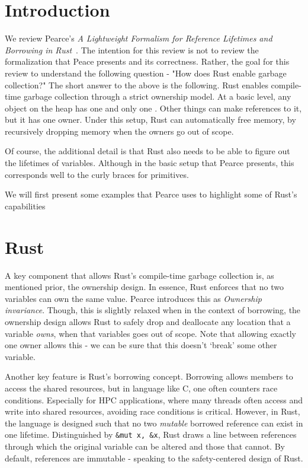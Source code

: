 \section{Introduction}
We review Pearce's \textit{A Lightweight Formalism for Reference Lifetimes and Borrowing in Rust}~\cite{paper}. 
%
The intention for this review is not to review the formalization that Peace presents and its correctness.
%
Rather, the goal for this review to understand the following question - "How does Rust enable  garbage collection?"
%
The short answer to the above is the following.
%
Rust enables compile-time garbage collection through a strict ownership model.
%
At a basic level, any object on the heap has one and only one . 
%
Other things can make references to it, but it has one owner.
%
Under this setup, Rust can automatically free memory, by recursively dropping memory when the owners go out of scope.

Of course, the additional detail is that Rust also needs to be able to figure out the lifetimes of variables.
%
Although in the basic setup that Pearce presents, this corresponds well to the curly braces for primitives.

We will first present some examples that Pearce uses to highlight some of Rust's capabilities

\section{Rust}
A key component that allows Rust's compile-time garbage collection is, as mentioned prior, the ownership design.
%
In essence, Rust enforces that no two variables can own the same value.
%
Pearce introduces this as \textit{Ownership invariance}.
%
Though, this is slightly relaxed when in the context of borrowing, the ownership design allows Rust to safely drop and deallocate any location that a variable \textit{owns}, when that variables goes out of scope.
%
Note that allowing exactly one owner allows this - we can be sure that this doesn't `break' some other variable.

Another key feature is Rust's borrowing concept.
%
Borrowing allows members to access the shared resources, but in language like C, one often counters race conditions. 
%
Especially for HPC applications, where many threads often access and write into shared resources, avoiding race conditions is critical.
%
However, in Rust, the language is designed such that no two \textit{mutable} borrowed reference can exist in one lifetime.
%
Distinguished by \texttt{&mut x, &x}, Rust draws a line between references through which the original variable can be altered and those that cannot.
%
By default, references are immutable - speaking to the safety-centered design of Rust.

